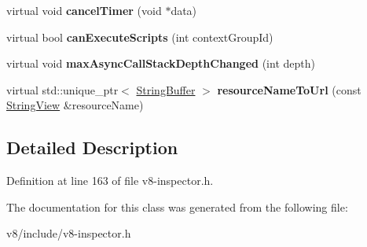 \begin{DoxyCompactItemize}
virtual void {\bfseries cancel\+Timer} (void $\ast$data)
\item 
\mbox{\label{classv8__inspector_1_1V8InspectorClient_a889174cfb82aee1148e61b9fe3801605}} 
virtual bool {\bfseries can\+Execute\+Scripts} (int context\+Group\+Id)
\item 
\mbox{\label{classv8__inspector_1_1V8InspectorClient_afdb594d52d1a1dfc751f11dbcf2166bf}} 
virtual void {\bfseries max\+Async\+Call\+Stack\+Depth\+Changed} (int depth)
\item 
\mbox{\label{classv8__inspector_1_1V8InspectorClient_a7db967e0049f3935b83de0788d111497}} 
virtual std\+::unique\+\_\+ptr$<$ \mbox{\hyperlink{classv8__inspector_1_1StringBuffer}{String\+Buffer}} $>$ {\bfseries resource\+Name\+To\+Url} (const \mbox{\hyperlink{classv8__inspector_1_1StringView}{String\+View}} \&resource\+Name)
\end{DoxyCompactItemize}


\subsection{Detailed Description}


Definition at line 163 of file v8-\/inspector.\+h.



The documentation for this class was generated from the following file\+:\begin{DoxyCompactItemize}
\item 
v8/include/v8-\/inspector.\+h\end{DoxyCompactItemize}

